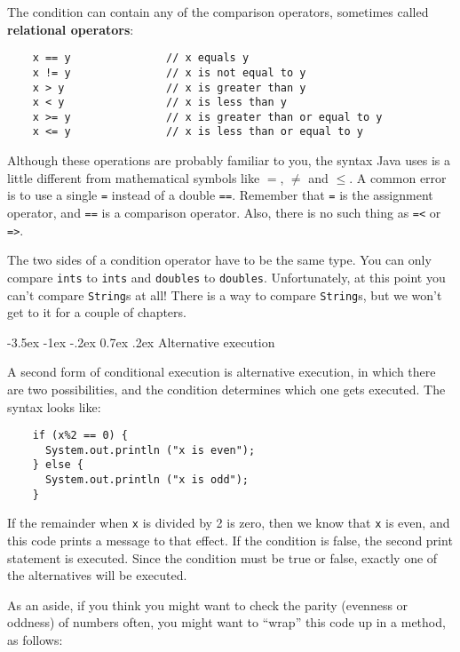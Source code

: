 \documentclass{book}
\makeatletter
\renewcommand{\section}{\@startsection 
    {section} {1} {0mm}%
    {-3.5ex \@plus -1ex \@minus -.2ex}%
    {0.7ex \@plus.2ex}%
    {\normalfont\Large\bfseries}}
\makeatother
\begin{document}

The condition can contain any of the comparison operators,
sometimes called {\bf relational operators}:

\begin{verbatim}
    x == y               // x equals y
    x != y               // x is not equal to y
    x > y                // x is greater than y
    x < y                // x is less than y
    x >= y               // x is greater than or equal to y
    x <= y               // x is less than or equal to y
\end{verbatim}
%
Although these operations are probably familiar to you, the
syntax Java uses is a little different from mathematical
symbols like $=$, $\neq$ and $\le$.  A common error is
to use a single {\tt =} instead of a double {\tt ==}.  Remember
that {\tt =} is the assignment operator, and {\tt ==} is
a comparison operator.  Also, there is no such thing as
{\tt =<} or {\tt =>}.

The two sides of a condition operator have to be the same
type.  You can only compare {\tt ints} to {\tt ints} and
{\tt doubles} to {\tt doubles}.  Unfortunately, at this
point you can't compare {\tt String}s at all!  There is
a way to compare {\tt String}s, but we won't get to it for a couple
of chapters.

\section {Alternative execution}
\label{alternative}

A second form of conditional execution is alternative execution,
in which there are two possibilities, and the condition determines
which one gets executed.  The syntax looks like:

\begin{verbatim}
    if (x%2 == 0) {
      System.out.println ("x is even");
    } else {
      System.out.println ("x is odd");
    }
\end{verbatim}
%
If the remainder when {\tt x} is divided by 2 is zero, then
we know that {\tt x} is even, and this code prints a message
to that effect.  If the condition is false, the second
print statement is executed.  Since the condition must
be true or false, exactly one of the alternatives will be
executed.

As an aside, if you think you might want to check the parity
(evenness or oddness) of numbers often, you might want to
``wrap'' this code up in a method, as follows:
\end{document}
